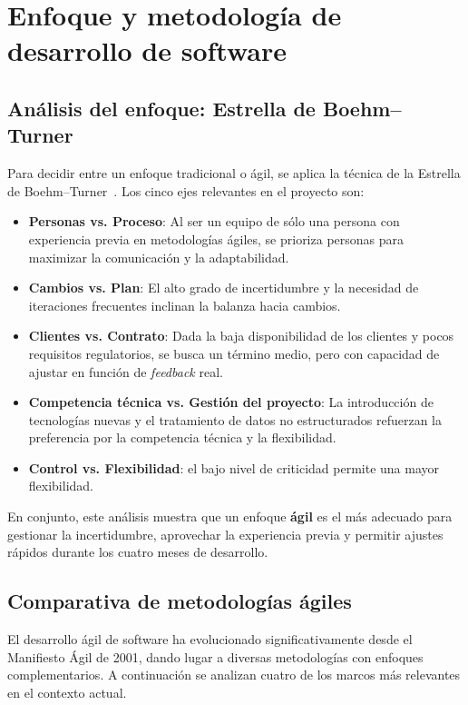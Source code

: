 \section{Enfoque y metodología de desarrollo de software}

\subsection{Análisis del enfoque: Estrella de Boehm–Turner}
Para decidir entre un enfoque tradicional o ágil, se aplica la técnica de la Estrella de Boehm–Turner~\cite{boehm_turner2003}. Los cinco ejes relevantes en el proyecto son:

\begin{itemize}
	\item \textbf{Personas vs. Proceso}: Al ser un equipo de sólo una persona con experiencia previa en metodologías ágiles, se prioriza personas para maximizar la comunicación y la adaptabilidad.
	\item \textbf{Cambios vs. Plan}: El alto grado de incertidumbre y la necesidad de iteraciones frecuentes inclinan la balanza hacia cambios.
	\item \textbf{Clientes vs. Contrato}: Dada la baja disponibilidad de los clientes y pocos requisitos regulatorios, se busca un término medio, pero con capacidad de ajustar en función de \textit{feedback} real.
	\item \textbf{Competencia técnica vs. Gestión del proyecto}: La introducción de tecnologías nuevas y el tratamiento de datos no estructurados refuerzan la preferencia por la competencia técnica y la flexibilidad.
	\item \textbf{Control vs. Flexibilidad}: el bajo nivel de criticidad permite una mayor flexibilidad.
\end{itemize}

En conjunto, este análisis muestra que un enfoque \textbf{ágil} es el más adecuado para gestionar la incertidumbre, aprovechar la experiencia previa y permitir ajustes rápidos durante los cuatro meses de desarrollo.

\subsection{Comparativa de metodologías ágiles}
El desarrollo ágil de software ha evolucionado significativamente desde el Manifiesto Ágil de 2001, dando lugar a diversas metodologías con enfoques complementarios. A continuación se analizan cuatro de los marcos más relevantes en el contexto actual.

